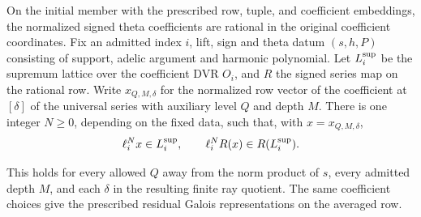 \begin{proposition}\label{prop:signed-theta-data}
On the initial member with the prescribed row, tuple, and
coefficient embeddings, the normalized signed theta coefficients
are rational in the original coefficient coordinates. Fix an admitted
index \(i\), lift, sign and theta datum \((s,h,P)\) consisting of support,
adelic argument and harmonic polynomial. Let \(L_i^{\rm sup}\) be the
supremum lattice over the coefficient DVR \(O_i\), and \(R\) the signed
series map on the rational row. Write \(x_{Q,M,\delta}\) for the
normalized row vector of the coefficient at \([\delta]\) of the universal
series with auxiliary level \(Q\) and depth \(M\). There is one integer
\(N\ge0\), depending on the fixed data, such that, with
\(x=x_{Q,M,\delta}\),
\[
 \ell_i^Nx\in L_i^{\rm sup},\qquad
 \ell_i^N R(x)\in R(L_i^{\rm sup}).
\]

This holds for every allowed \(Q\) away from the norm product of
\(s\), every admitted depth \(M\), and each \(\delta\) in the resulting
finite ray quotient. The same coefficient
choices give the prescribed residual Galois representations on the
averaged row.
\end{proposition}

